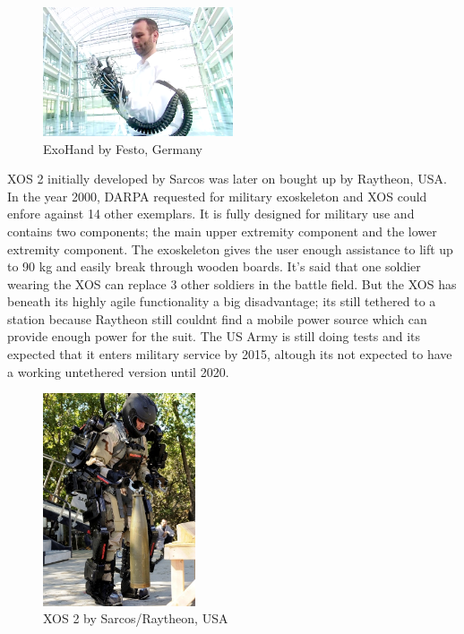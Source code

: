\documentclass[letterpaper, 10 pt, conference]{ieeeconf}  %
\begin{document}

\begin{figure}[H]
  \centering
    \includegraphics[width=0.5\textwidth]{img/exohand}
  \caption{ExoHand by Festo, Germany}
\end{figure}


XOS 2 initially developed by Sarcos was later on bought up by Raytheon, USA. In the year 2000, DARPA requested for
military exoskeleton and XOS could enfore against 14 other exemplars. It is fully designed for military use and
contains two components; the main upper extremity component and the lower extremity component. The exoskeleton gives
the user enough assistance to lift up to 90 kg and easily break through wooden boards. It's said that one soldier
wearing the XOS can replace 3 other soldiers in the battle field. But the XOS has beneath its highly agile functionality
a big disadvantage; its still tethered to a station because Raytheon still couldnt find a mobile power source which
can provide enough power for the suit. The US Army is still doing tests and its expected that it enters military service
by 2015, altough its not expected to have a working untethered version until 2020.

\newpage

\begin{figure}[H]
  \centering
    \includegraphics[width=0.4\textwidth]{img/xos2}
  \caption{XOS 2 by Sarcos/Raytheon, USA}
\end{figure}
\end{document}
